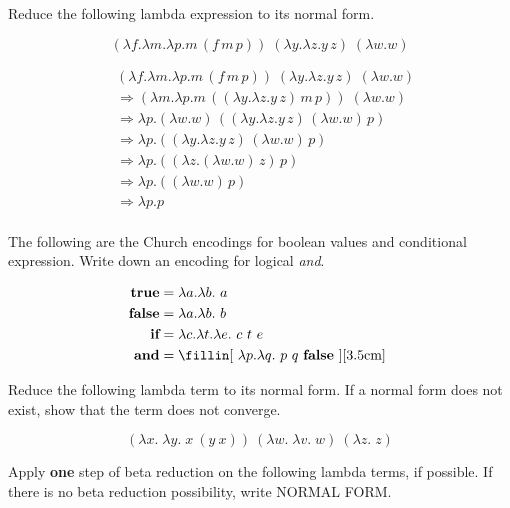 \documentclass[addpoints]{exam}
\renewcommand{\L}[2]{\lambda #1.#2}
\begin{document}
\begin{questions}
  \newpage
  \question
  Reduce the following lambda expression to its normal form.

  \[
    (\L{f}{\L{m}{\L{p}{m\,(f\,m\,p)}}})\;(\L{y}{\L{z}{y\,z}})\;(\L{w}{w})
  \]

  \begin{solutionbox}{5cm}
    \begin{align*}
      & (\L{f}{\L{m}{\L{p}{m\,(f\,m\,p)}}})\;(\L{y}{\L{z}{y\,z}})\;(\L{w}{w})\\
      & \Rightarrow (\L{m}{\L{p}{m\,((\L{y}{\L{z}{y\,z}})\,m\,p)}})\;(\L{w}{w})\\
      & \Rightarrow \L{p}{(\L{w}{w})\,((\L{y}{\L{z}{y\,z}})\,(\L{w}{w})\,p)}\\
      & \Rightarrow \L{p}{((\L{y}{\L{z}{y\,z}})\,(\L{w}{w})\,p)}\\
      & \Rightarrow \L{p}{((\L{z}{(\L{w}{w})\,z})\,p)}\\
      & \Rightarrow \L{p}{((\L{w}{w})\,p)}\\
      & \Rightarrow \L{p}{p}\\
    \end{align*}
  \end{solutionbox}


  \question
  The following are the Church encodings for boolean values and conditional expression.
  Write down an encoding for logical \emph{and}.

  \begin{align*}
    \textbf{true} & = \lambda a. \lambda b.~a \\
    \textbf{false}& = \lambda a. \lambda b.~b \\
    \textbf{if}   & = \lambda c. \lambda t. \lambda e.~c~t~e\\
    \textbf{and}  & = \textrm{\fillin[ $\lambda p. \lambda q.~p~q~\textbf{false}$ ][3.5cm] }\\
  \end{align*}
  
  \question
  Reduce the following lambda term to its normal form. If a normal form
  does not exist, show that the term does not converge.

  \[
  (\lambda x.\;\lambda y.\;x~(y~x))~(\lambda w.\;\lambda v.\;w)~(\lambda z.\;z)
  \]


  \question
  Apply \textbf{one} step of beta reduction on the following lambda terms,
  if possible. If there is no beta reduction possibility, write NORMAL FORM.


\end{questions}
\end{document}
